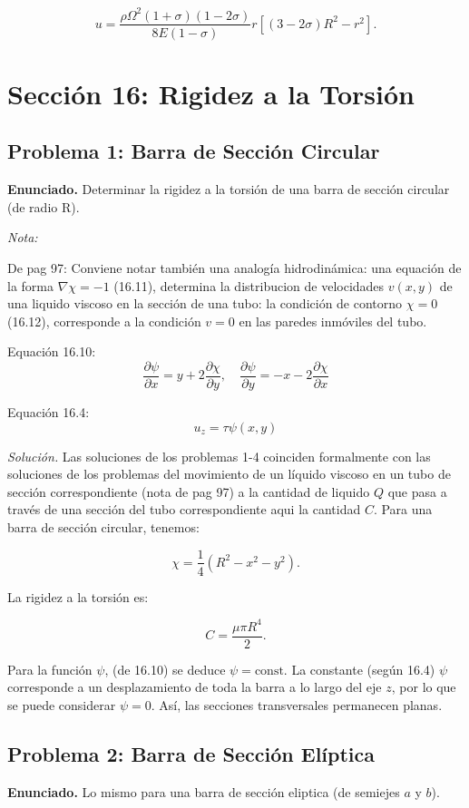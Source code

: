 \documentclass{article}
\begin{document}
$$
u = \frac{\rho \Omega^2 (1+\sigma)(1-2\sigma)}{8E(1-\sigma)} r [(3-2\sigma)R^2 - r^2].
$$

\section*{Sección 16: Rigidez a la Torsión}

\subsection*{Problema 1: Barra de Sección Circular}
\textbf{Enunciado.} Determinar la rigidez a la torsión de una barra de sección circular (de radio R).

\textit{Nota:}

De pag 97: Conviene notar también una analogía hidrodinámica: una equación de la forma $\nabla \chi = -1$ (16.11), determina la distribucion de velocidades $v(x,y)$ de una liquido viscoso en la sección de una tubo: la condición de contorno $\chi = 0$ (16.12), corresponde a la condición $v=0$ en las paredes inmóviles del tubo.

Equación 16.10: $$ \frac{\partial \psi}{\partial x} = y + 2\frac{\partial \chi}{\partial y}, \quad \frac{\partial \psi}{\partial y} = -x -2\frac{\partial \chi}{\partial x} $$

Equación 16.4: $$ u_z = \tau \psi(x,y) $$

\textit{Solución.} Las soluciones de los problemas 1-4 coinciden formalmente con las soluciones de los problemas del movimiento de un líquido viscoso en un tubo de sección correspondiente (nota de pag 97) a la cantidad de liquido $Q$ que pasa a través de una sección del tubo correspondiente aqui la cantidad $C$. Para una barra de sección circular, tenemos:

$$
\chi = \frac{1}{4} (R^2 - x^2 - y^2).
$$

La rigidez a la torsión es:

$$
C = \frac{\mu \pi R^4}{2}.
$$

Para la función $\psi$, (de 16.10) se deduce $\psi = \text{const}$. La constante (según 16.4) $\psi$ corresponde a un desplazamiento de toda la barra a lo largo del eje $z$, por lo que se puede considerar $\psi = 0$. Así, las secciones transversales permanecen planas.

\subsection*{Problema 2: Barra de Sección Elíptica}
\textbf{Enunciado.} Lo mismo para una barra de sección eliptica (de semiejes $a$ y $b$).
\end{document}
